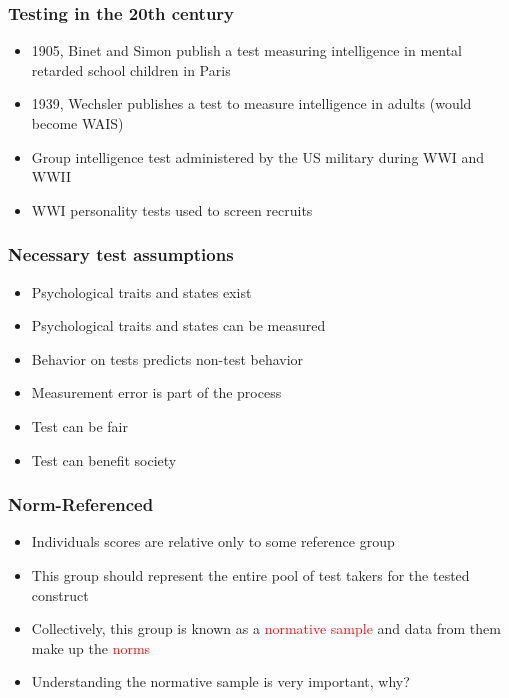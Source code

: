 \documentclass[dvipsnames]{beamer}\usepackage[]{graphicx}\usepackage[]{color}
\begin{document}
\begin{frame}
\frametitle{Testing in the 20th century}
\begin{itemize}
\item 1905, Binet and Simon publish a test measuring intelligence in mental retarded school children in Paris
\item 1939, Wechsler publishes a test to measure intelligence in adults (would become WAIS)
\item Group intelligence test administered by the US military during WWI and WWII
\item WWI personality tests used to screen recruits
\end{itemize}
\end{frame}

\begin{frame}
\frametitle{Necessary test assumptions}
\begin{itemize}
\item<1-> Psychological traits and states exist
\item<2-> Psychological traits and states can be measured
\item<3-> Behavior on tests predicts non-test behavior
\item<4-> Measurement error is part of the process
\item<5-> Test can be fair
\item<6-> Test can benefit society
\end{itemize}
\end{frame}

\begin{frame}
\frametitle{Norm-Referenced}
\begin{itemize}
\item<1-> Individuals scores are relative only to some reference group
\item<2-> This group should represent the entire pool of test takers for the tested construct
\item<3-> Collectively, this group is known as a \textcolor{red}{normative sample} and data from them make up the \textcolor{red}{norms}
\item<4->Understanding the normative sample is very important, why?
\end{itemize}
\end{frame}
\end{document}
